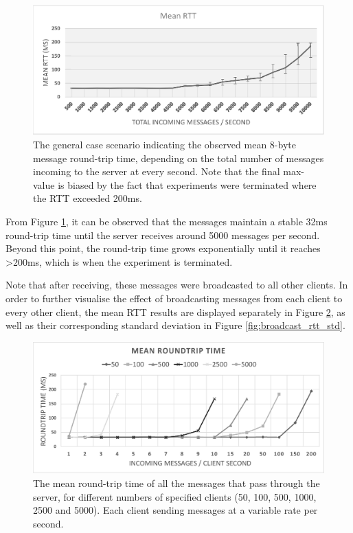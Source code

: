 \documentclass[bsc, 12pt, twoside, singlespacing, parskip, abbrevs, notimes, normalheadings, logo]{styles/infthesis}
\begin{document}
\begin{figure}[H]
\centering
\includegraphics[scale=0.86]{images/mean_rtt.eps}
\caption{The general case scenario indicating the observed mean 8-byte message round-trip time, depending on the total number of messages incoming to the server at every second. Note that the final max-value is biased by the fact that experiments were terminated where the RTT exceeded 200ms.}
\label{fig:mean_rtt}
\end{figure}

From Figure \ref{fig:mean_rtt}, it can be observed that the messages maintain a stable 32ms round-trip time until the server receives around 5000 messages per second. Beyond this point, the round-trip time grows exponentially until it reaches >200ms, which is when the experiment is terminated.

Note that after receiving, these messages were broadcasted to all other clients. In order to further visualise the effect of broadcasting messages from each client to every other client, the mean RTT results are displayed separately in Figure \ref{fig:broadcast_rtt_mean}, as well as their corresponding standard deviation in Figure \ref{fig:broadcast_rtt_std}.

\begin{figure}[H]
\centering
\includegraphics[scale=0.58]{images/test_SERVER_RTTmean.eps}
\caption{The mean round-trip time of all the messages that pass through the server, for different numbers of specified clients (50, 100, 500, 1000, 2500 and 5000). Each client sending messages at a variable rate per second.}
\label{fig:broadcast_rtt_mean}
\end{figure}
\end{document}
